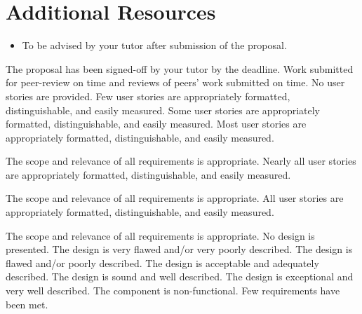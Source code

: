 \documentclass{../fal_assignment}
\begin{document}
\section*{Additional Resources}

\begin{itemize}
    \item To be advised by your tutor after submission of the proposal.
\end{itemize}

\begin{markingrubric}
%
        \grade 		The proposal has been signed-off by your tutor by the deadline.
%
        \grade 		Work submitted for peer-review on time and reviews of peers' work submitted on time.
%
        \grade\fail 	No user stories are provided.
        \grade 		Few user stories are appropriately formatted, distinguishable, and easily measured.
        \grade 		Some user stories are appropriately formatted, distinguishable, and easily measured.
        \grade 		Most user stories are appropriately formatted, distinguishable, and easily measured.
        \par 		The scope and relevance of all requirements is appropriate.
        \grade 		Nearly all user stories are appropriately formatted, distinguishable, and easily measured.
        \par 		The scope and relevance of all requirements is appropriate.
        \grade 		All user stories are appropriately formatted, distinguishable, and easily measured.
        \par 		The scope and relevance of all requirements is appropriate.
%
        \grade\fail 	No design is presented.
        \grade 		The design is very flawed and/or very poorly described.
        \grade 		The design is flawed and/or poorly described.
        \grade 		The design is acceptable and adequately described.
        \grade 		The design is sound and well described.
        \grade 		The design is exceptional and very well described.
%
        \grade\fail 	The component is non-functional.
        \grade 		Few requirements have been met.

\end{markingrubric}
\end{document}
